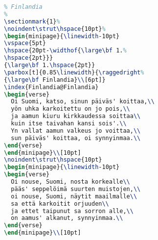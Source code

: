 \begin{lstlisting}[language=TeX]
%
% Finlandia
%
\sectionmark{1}%
\noindent\strut\hspace{10pt}%
\begin{minipage}{\linewidth-10pt}
\vspace{5pt}
\hspace{20pt-\widthof{\large\bf 1.%
\hspace{2pt}}}
{\large\bf 1.\hspace{2pt}}
\parbox[t]{0.85\linewidth}{\raggedright%
{\large\bf Finlandia}\\[6pt]}
\index{Finlandia@Finlandia}
\begin{verse}
  Oi Suomi, katso, sinun päiväs' koittaa,\\
  yön uhka karkoitettu on jo pois,\\
  ja aamun kiuru kirkkaudessa soittaa\\
  kuin itse taivahan kansi sois'.\\
  Yn vallat aamun valkeus jo voittaa,\\
  sun päiväs' koittaa, oi synnyinmaa.\\
\end{verse}
\end{minipage}\\[10pt]
\noindent\strut\hspace{10pt}
\begin{minipage}{\linewidth-10pt}
\begin{verse}
  Oi nouse, Suomi, nosta korkealle\\
  pääs' seppelöimä suurten muistojen,\\
  oi nouse, Suomi, näytit maailmalle\\
  sa että karkoitit orjuuden\\
  ja ettet taipunut sa sorron alle,\\
  on aamus' alkanut, synnyinmaa.\\
\end{verse}
\end{minipage}\\[10pt]
\end{lstlisting}
\clearpage
\headerfooteron{}
\fancyhead[CE]{\LaTeX}